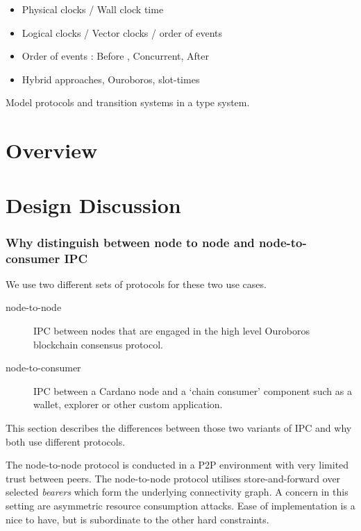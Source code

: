 \documentclass{report}
\newcommand{\wip}[1]{\color{magenta}{#1}\color{black}}
\theoremstyle{definition}{
  \newtheorem{lemma}{Lemma}[section] %
  \newtheorem{definition}[lemma]{Definition}
}
\theoremstyle{theorem}{
  \newtheorem{invariant}[lemma]{Invariant}
  \newtheorem{proofobligation}[lemma]{Proof Obligation}
}
\numberwithin{equation}{lemma}
\begin{document}
{\begin{description}
\begin{itemize}
  \item Physical clocks / Wall clock time
  \item Logical clocks / Vector clocks / order of events
  \item Order of events : Before , Concurrent, After
  \item Hybrid approaches, Ouroboros, slot-times
  \end{itemize}
\item[Session Types]
     Model protocols and transition systems in a type system.
\item[Pi-calculus]
\item[Process algebras]
\end{description}
}

\wip{WIP: Poldercast,etc}
\section{Overview}
\section{Design Discussion}
\subsubsection{Why distinguish between node to node and node-to-consumer IPC}
\label{why_distinguish_protocols}
We use two different sets of protocols for these two use cases.

\begin{description}
\item[node-to-node] IPC between nodes that are engaged in the high level Ouroboros
      blockchain consensus protocol.
\item[node-to-consumer] IPC between a Cardano node and a `chain consumer' component such as a
      wallet, explorer or other custom application.
\end{description}

This section describes the differences between those two variants of IPC and why both use
different protocols.

The node-to-node protocol is conducted in a P2P environment
with very limited trust between peers. The node-to-node protocol utilises
store-and-forward over selected \emph{bearers} which form the underlying
connectivity graph. A concern in this setting are asymmetric resource
consumption attacks. Ease of implementation is a nice to have, but is
subordinate to the other hard constraints.
\end{document}
